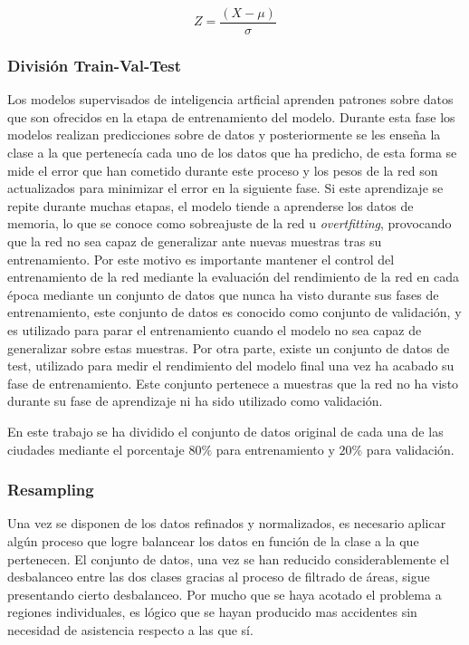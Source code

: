 \documentclass{uathesis-es}
\begin{document}
\begin{equation}
       Z = \frac{(X - \mu)}{\sigma}
\end{equation}


\subsubsection{División Train-Val-Test}


Los modelos supervisados de inteligencia artficial aprenden patrones sobre datos que son ofrecidos en la etapa de entrenamiento del modelo. Durante esta fase los modelos realizan predicciones sobre de datos y posteriormente se les enseña la clase a la que pertenecía cada uno de los datos que ha predicho, de esta forma se mide el error que han cometido durante este proceso y los pesos de la red son actualizados para minimizar el error en la siguiente fase. Si este aprendizaje se repite durante muchas etapas, el modelo tiende a aprenderse los datos de memoria, lo que se conoce como sobreajuste de la red u \textit{overtfitting}, provocando que la red no sea capaz de generalizar ante nuevas muestras tras su entrenamiento. Por este motivo es importante mantener el control del entrenamiento de la red mediante la evaluación del rendimiento de la red en cada época mediante un conjunto de datos que nunca ha visto durante sus fases de entrenamiento, este conjunto de datos es conocido como conjunto de validación, y es utilizado para parar el entrenamiento cuando el modelo no sea capaz de generalizar sobre estas muestras. Por otra parte, existe un conjunto de datos de test, utilizado para medir el rendimiento del modelo final una vez ha acabado su fase de entrenamiento. Este conjunto pertenece a muestras que la red no ha visto durante su fase de aprendizaje ni ha sido utilizado como validación.

En este trabajo se ha dividido el conjunto de datos original de cada una de las ciudades mediante el porcentaje $80\%$ para entrenamiento y $20\%$ para validación.

\subsubsection{Resampling}

Una vez se disponen de los datos refinados y normalizados, es necesario aplicar algún proceso que logre balancear los datos en función de la clase a la que pertenecen. El conjunto de datos, una vez se han reducido considerablemente el desbalanceo entre las dos clases gracias al proceso de filtrado de áreas, sigue presentando cierto desbalanceo. Por mucho que se haya acotado el problema a regiones individuales, es lógico que se hayan producido mas accidentes sin necesidad de asistencia respecto a las que sí.
\end{document}
